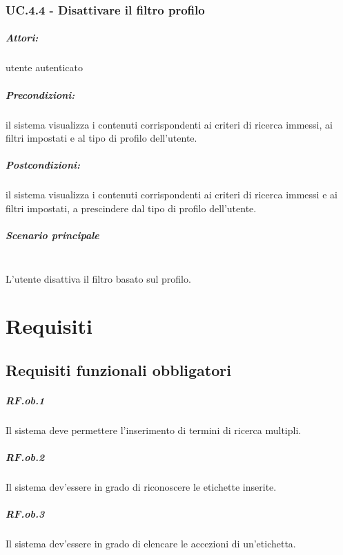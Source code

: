 \documentclass[10pt,a4paper,headinclude,footinclude,hidelinks]{scrreprt} %
\begin{document}
	\subsection[UC.4.4]{UC.4.4 - Disattivare il filtro profilo}
	\label{sec:stage:ar:uc:4_4}
	\paragraph{Attori:} utente autenticato
	\paragraph{Precondizioni:} il sistema visualizza i contenuti corrispondenti ai criteri di ricerca immessi, ai filtri impostati e al tipo di profilo dell'utente.
	\paragraph{Postcondizioni:} il sistema visualizza i contenuti corrispondenti ai criteri di ricerca immessi e ai filtri impostati, a prescindere dal tipo di profilo dell'utente.
	\paragraph{Scenario principale} \hfill \\
	L'utente disattiva il filtro basato sul profilo.

	\chapter{Requisiti}
	\label{ch:stage:ar:requisiti}

	\section{Requisiti funzionali obbligatori}
	\label{ch:stage:ar:requisiti:ob}

	\paragraph{RF.ob.1} Il sistema deve permettere l'inserimento di termini di ricerca multipli.

	\paragraph{RF.ob.2} Il sistema dev'essere in grado di riconoscere le etichette inserite.

	\paragraph{RF.ob.3} Il sistema dev'essere in grado di elencare le accezioni di un'etichetta.
\end{document}
